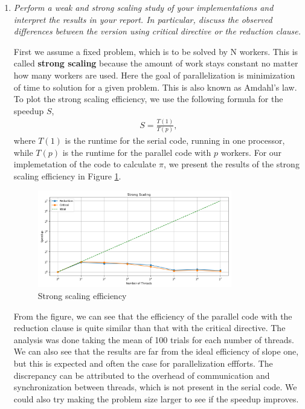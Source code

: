 \documentclass[unicode,11pt,a4paper,oneside,numbers=endperiod,openany]{scrartcl}
\begin{document}
\begin{enumerate}
    \item \textit{Perform a weak and strong scaling study of your
    implementations and interpret the results in your report. 
    In particular, discuss the observed differences between the version using
    critical directive or the reduction clause.}

    First we assume a fixed problem, which is to be solved by N workers. 
    This is called \textbf{strong scaling} because the amount of work stays constant no
    matter how many workers are used. Here the goal of parallelization is
    minimization of time to solution for a given problem. 
    This is also known as Amdahl's law.
    To plot the strong scaling efficiency, we use the following formula for the speedup $S$,
    \begin{align}
      S =  \frac{T(1)}{T(p)},
    \end{align}
    where $T(1)$ is the runtime for the serial code, running in one processor, while
    $T(p)$ is the runtime for the parallel code with $p$ workers.
    For our implemetation of the code to calculate $\pi$, we present the results 
    of the strong scaling efficiency in Figure \ref{fig:strong-scaling}.
    \begin{figure}[h]
      \centering
      \includegraphics[width=0.8\textwidth]{../pi/strong_scaling_plot.png}
      \caption{Strong scaling efficiency}
      \label{fig:strong-scaling}
    \end{figure}
    From the figure, we can see that the efficiency of the parallel code with
    the reduction clause is quite similar than that with the critical directive.
    The analysis was done taking the mean of 100 trials for each number of
    threads.
    We can also see that the results are far from the ideal efficiency of slope
    one, but this is expected and often the case for parallelization effforts.
    The discrepancy can be attributed to the overhead of communication and
    synchronization between threads, which is not present in the serial code.
    We could also try making the problem size larger to see if the speedup improves.
    

\end{enumerate}
\end{document}
